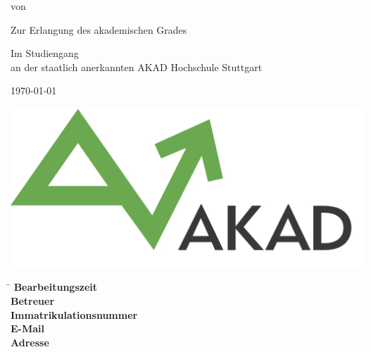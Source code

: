 \begin{titlepage}
\begin{center}
\thispagestyle{empty}

\Huge{\Titel}
\vspace{2cm}
\onehalfspacing

\Large{\textbf{\Arbeitstyp}}

\vspace{1cm}
\normalsize

von

\vspace{.5cm} 
\large{\Name}
\normalsize
\vspace{1cm}

\ifassignment
\else
Zur Erlangung des akademischen Grades \\
\textbf{\Grad}
\vspace{1cm}
\fi

Im Studiengang \Studiengang \\
an der staatlich anerkannten AKAD Hochschule Stuttgart
\vspace{2cm}

\today

\vspace{2cm}

\includegraphics[scale=0.35]{img/akad_logo.png}

\end{center}

\vfill
\begin{spacing}{1.2}
    \begin{tabbing}
	    \hspace{9cm}     \= \kill
	    \textbf{Bearbeitungszeit}  \>  \Bearbeitungszeit \\
	    \textbf{Betreuer}              \>  \Betreuer \\
	    \textbf{Immatrikulationsnummer}  \>  \Immatrikulationsnummer \\
	    \textbf{E-Mail}		\> \href{mailto:\Email}{\Email} \\
	    \textbf{Adresse}		\> \Strasse \\
	    		\> \PlzOrt
	\end{tabbing}
\end{spacing}
\restoregeometry
\end{titlepage}